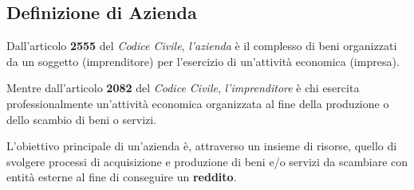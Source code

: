 \subsection{Definizione di Azienda}
Dall'articolo \textbf{2555} del \textit{Codice Civile}, \textit{l’azienda} è il complesso di beni organizzati da un soggetto (imprenditore) per l’esercizio di un’attività economica (impresa).

Mentre dall'articolo \textbf{2082} del \textit{Codice Civile}, \textit{l'imprenditore} è chi esercita professionalmente un’attività economica organizzata al fine della produzione o dello scambio di beni o servizi.

L'obiettivo principale di un'azienda è, attraverso un insieme di risorse, quello di svolgere processi di acquisizione e produzione di beni e/o servizi da scambiare con entità esterne al fine di conseguire un \textbf{reddito}.